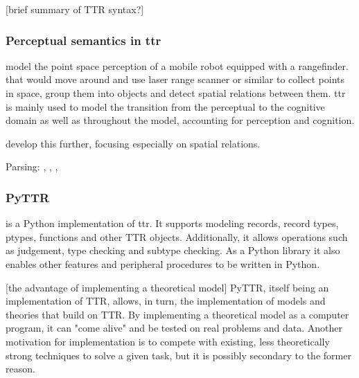 \documentclass[11pt, a4paper]{article}
\begin{document}
[brief summary of TTR syntax?]



\subsubsection{Perceptual semantics in \gls{ttr}}

\cite{LarssonDialoguesHaveContent2011}

\cite{DobnikModellinglanguageaction2012}

\cite{lspc} model the point space perception of a mobile robot equipped with a rangefinder.
 that would move around and use laser range scanner or similar to collect points in space, group them into objects and detect spatial relations between them.
\Gls{ttr} is mainly used to model the transition from the perceptual to the cognitive domain as well as 
 throughout the model, accounting for perception and cognition.

\cite{ttrspat} develop this further, focusing especially on spatial relations.

\cite{LarssonFormalsemanticsperceptual2015}

Parsing: \cite{CooperRecordsRecordTypes2005}, \cite{RobinCooperAustiniantruthattitudes2005}, \cite{CooperTypetheorysemantics2012}, \cite{CooperTypetheorylanguage2016}



\subsubsection{PyTTR}

\cite{pyttr} is a Python implementation of \gls{ttr}.
It supports modeling records, record types, ptypes, functions and other TTR objects.
Additionally, it allows operations such as judgement, type checking and subtype checking.
As a Python library it also enables other features and peripheral procedures to be written in Python.

[the advantage of implementing a theoretical model]
PyTTR, itself being an implementation of TTR, allows, in turn, the implementation of models and theories that build on TTR.
By implementing a theoretical model as a computer program, it can "come alive" and be tested on real problems and data.
Another motivation for implementation is to compete with existing, less theoretically strong techniques to solve a given task, but it is possibly secondary to the former reason.

\end{document}
